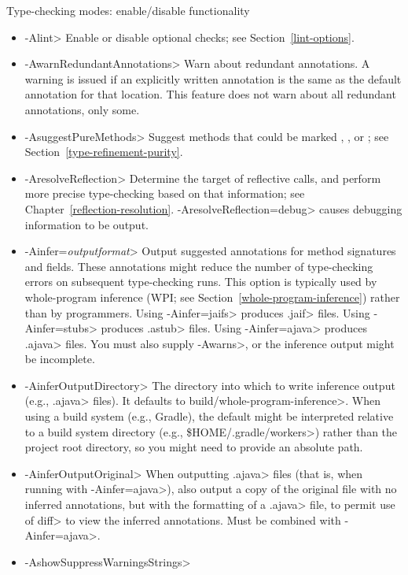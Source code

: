 Type-checking modes:  enable/disable functionality
\begin{itemize}
\item \<-Alint>
  Enable or disable optional checks; see Section~\ref{lint-options}.
\item \<-AwarnRedundantAnnotations>
  Warn about redundant annotations.
  A warning is issued if an explicitly written annotation
  is the same as the default annotation for that location.
  This feature does not warn about all redundant annotations, only some.
\item \<-AsuggestPureMethods>
  Suggest methods that could be marked
  ,
  ,
  or ; see
  Section~\ref{type-refinement-purity}.
\item \<-AresolveReflection>
  Determine the target of reflective calls, and perform more precise
  type-checking based on that information; see
  Chapter~\ref{reflection-resolution}.  \<-AresolveReflection=debug> causes
  debugging information to be output.
\item \<-Ainfer=\emph{outputformat}>
  Output suggested annotations for method signatures and fields.
  These annotations might reduce the number of type-checking
  errors on subsequent type-checking runs.  This option is
  typically used by whole-program inference (WPI; see
  Section~\ref{whole-program-inference}) rather than by programmers.
  Using \<-Ainfer=jaifs> produces \<.jaif> files.
  Using \<-Ainfer=stubs> produces \<.astub> files.
  Using \<-Ainfer=ajava> produces \<.ajava> files.
  You must also supply \<-Awarns>, or the inference output might be incomplete.
\item \<-AinferOutputDirectory>
  The directory into which to write inference output (e.g., \<.ajava>
  files).  It defaults to \<build/whole-program-inference>.  When using
  a build system (e.g., Gradle), the default might be interpreted relative to
  a build system directory (e.g., \<\$HOME/.gradle/workers>) rather than the
  project root directory, so you might need to provide an absolute path.
\item \<-AinferOutputOriginal>
  When outputting \<.ajava> files (that is, when running with \<-Ainfer=ajava>),
  also output a copy of the original file with no inferred annotations,
  but with the formatting of a \<.ajava> file, to permit use of \<diff>
  to view the inferred annotations. Must be combined with \<-Ainfer=ajava>.
\item \<-AshowSuppressWarningsStrings>

\end{itemize}
